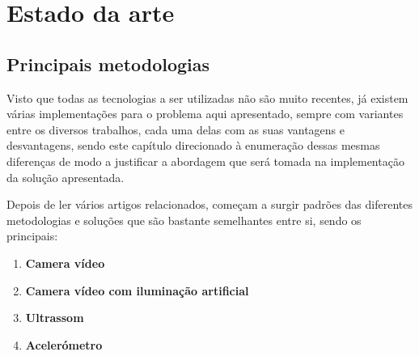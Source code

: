 \chapter{Estado da arte}
\label{cha:estado_da_arte}

\section{Principais metodologias} %
\label{sec:principais_metodologias}

Visto que todas as tecnologias a ser utilizadas não são muito recentes, já existem várias implementações para o problema aqui apresentado, sempre com variantes entre os diversos trabalhos, cada uma delas com as suas vantagens e desvantagens, sendo este capítulo direcionado à enumeração dessas mesmas diferenças de modo a justificar a abordagem que será tomada na implementação da solução apresentada.

Depois de ler vários artigos relacionados, começam a surgir padrões das diferentes metodologias e soluções que são bastante semelhantes entre si, sendo os principais:
\begin{enumerate}
	\item \textbf{Camera vídeo}
	\item \textbf{Camera vídeo com iluminação artificial}
	\item \textbf{Ultrassom}
	\item \textbf{Acelerómetro}
\end{enumerate}

